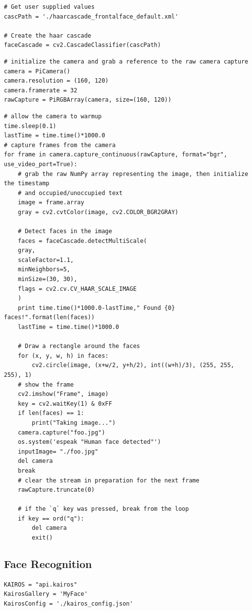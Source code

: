 \documentclass[sigconf]{acmart}
\begin{document}
\begin{lstlisting}
# Get user supplied values
cascPath = './haarcascade_frontalface_default.xml'

# Create the haar cascade
faceCascade = cv2.CascadeClassifier(cascPath)
\end{lstlisting}

\begin{lstlisting}
# initialize the camera and grab a reference to the raw camera capture
camera = PiCamera()
camera.resolution = (160, 120)
camera.framerate = 32
rawCapture = PiRGBArray(camera, size=(160, 120))
\end{lstlisting}

\begin{lstlisting}
# allow the camera to warmup
time.sleep(0.1)
lastTime = time.time()*1000.0
# capture frames from the camera
for frame in camera.capture_continuous(rawCapture, format="bgr", use_video_port=True):
	# grab the raw NumPy array representing the image, then initialize the timestamp
	# and occupied/unoccupied text
    image = frame.array
    gray = cv2.cvtColor(image, cv2.COLOR_BGR2GRAY)
    
    # Detect faces in the image
    faces = faceCascade.detectMultiScale(
    gray,
    scaleFactor=1.1,
    minNeighbors=5,
    minSize=(30, 30),
    flags = cv2.cv.CV_HAAR_SCALE_IMAGE
    )
    print time.time()*1000.0-lastTime," Found {0} faces!".format(len(faces))
    lastTime = time.time()*1000.0

    # Draw a rectangle around the faces
    for (x, y, w, h) in faces:
        cv2.circle(image, (x+w/2, y+h/2), int((w+h)/3), (255, 255, 255), 1)
    # show the frame
    cv2.imshow("Frame", image)
    key = cv2.waitKey(1) & 0xFF
    if len(faces) == 1:
        print("Taking image...")
	camera.capture("foo.jpg")
	os.system('espeak "Human face detected"')
	inputImage= "./foo.jpg"
	del camera
	break 
	# clear the stream in preparation for the next frame
    rawCapture.truncate(0)
    
	# if the `q` key was pressed, break from the loop
    if key == ord("q"):
        del camera
        exit()
\end{lstlisting}


\subsection{Face Recognition}
\begin{lstlisting}
KAIROS = "api.kairos"
KairosGallery = 'MyFace'
KairosConfig = './kairos_config.json'
\end{lstlisting}
\end{document}
